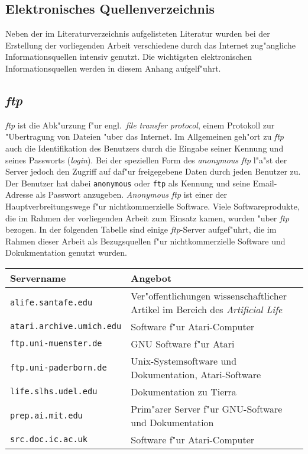 \begin{appendix}


\chapter{Elektronisches Quellenverzeichnis}
\label{electronicsources}

Neben der im Literaturverzeichnis aufgelisteten Literatur wurden bei
der Erstellung der vorliegenden Arbeit verschiedene durch das
Internet zug"angliche Informationsquellen intensiv genutzt.
Die wichtigsten elektronischen Informationsquellen werden in diesem Anhang
aufgelf"uhrt.


\section{\textsl{ftp}}
\label{ftp-app}

{\slshape ftp} ist die Abk"urzung f"ur engl.\ {\slshape file transfer protocol}, einem
Protokoll zur "Ubertragung von Dateien "uber das Internet. Im Allgemeinen geh"ort zu {\slshape ftp}
auch die Identifikation des Benutzers durch die Eingabe seiner
Kennung und seines Passworts ({\slshape login}). Bei der speziellen Form des {\slshape anonymous ftp}
l"a"st der Server jedoch den Zugriff auf daf"ur freigegebene Daten durch
jeden Benutzer zu. Der Benutzer hat dabei \verb|anonymous| oder
\verb|ftp| als Kennung und seine Email-Adresse als Passwort anzugeben.
{\slshape Anonymous ftp} ist einer der Hauptverbreitungswege f"ur
nichtkommerzielle Software. Viele Softwareprodukte, die im Rahmen der
vorliegenden Arbeit zum Einsatz kamen, wurden "uber {\slshape ftp}
bezogen. In der folgenden Tabelle sind einige {\slshape ftp}-Server
aufgef"uhrt, die im Rahmen dieser Arbeit als Bezugsquellen f"ur
nichtkommerzielle Software und Dokukmentation genutzt wurden.

\medskip
\noindent\begin{tabularx}{\linewidth}{|l|X|} \hline
Servername & Angebot \\ \hline
\verb|alife.santafe.edu|       & Ver"offentlichungen wissenschaftlicher Artikel im Bereich
                                 des {\slshape Artificial Life} \\
\verb|atari.archive.umich.edu| & Software f"ur Atari-Computer \\
\verb|ftp.uni-muenster.de|     & GNU Software f"ur Atari \\ 
\verb|ftp.uni-paderborn.de|    & Unix-Systemsoftware und Dokumentation, Atari-Soft\-ware \\
\verb|life.slhs.udel.edu|      & Dokumentation zu Tierra \protect\cite{Ray92} \\
\verb|prep.ai.mit.edu|         & Prim"arer Server f"ur GNU-Software und Dokumentation \\
\verb|src.doc.ic.ac.uk|        & Software f"ur Atari-Computer \\ \hline
\end{tabularx}
\medskip



\end{appendix}

